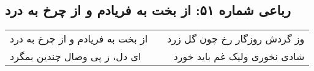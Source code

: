\begin{center}
\section*{رباعی شماره ۵۱: از بخت به فریادم و از چرخ به درد}
\label{sec:051}
\begin{longtable}{l p{0.5cm} r}
از بخت به فریادم و از چرخ به درد
&&
وز گردش روزگار رخ چون گل زرد
\\
ای دل، ز پی وصال چندین بمگرد
&&
شادی نخوری ولیک غم باید خورد
\\
\end{longtable}
\end{center}
